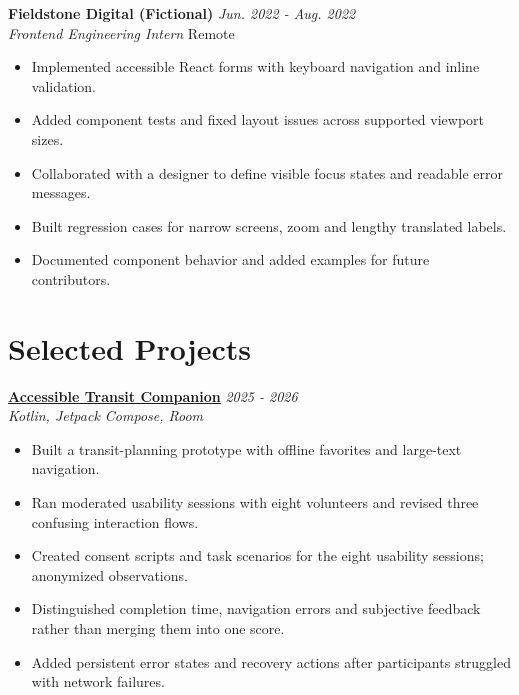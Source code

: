 \documentclass[11pt,a4paper]{article}
\begin{document}
\textbf{Fieldstone Digital (Fictional)} \hfill \textit{Jun. 2022 - Aug. 2022}\\
\textit{Frontend Engineering Intern} \hfill Remote
\begin{itemize}[leftmargin=*,noitemsep,topsep=2pt]
\item Implemented accessible React forms with keyboard navigation and inline validation.
\item Added component tests and fixed layout issues across supported viewport sizes.
\item Collaborated with a designer to define visible focus states and readable error messages.
\item Built regression cases for narrow screens, zoom and lengthy translated labels.
\item Documented component behavior and added examples for future contributors.
\end{itemize}
\vspace{4pt}

\section{Selected Projects}
\textbf{\href{https://example.com/demos/transit-companion}{Accessible Transit Companion}} \hfill \textit{2025 - 2026}\\
\textit{Kotlin, Jetpack Compose, Room}
\begin{itemize}[leftmargin=*,noitemsep,topsep=2pt]
\item Built a transit-planning prototype with offline favorites and large-text navigation.
\item Ran moderated usability sessions with eight volunteers and revised three confusing interaction flows.
\item Created consent scripts and task scenarios for the eight usability sessions; anonymized observations.
\item Distinguished completion time, navigation errors and subjective feedback rather than merging them into one score.
\item Added persistent error states and recovery actions after participants struggled with network failures.
\end{itemize}
\end{document}
